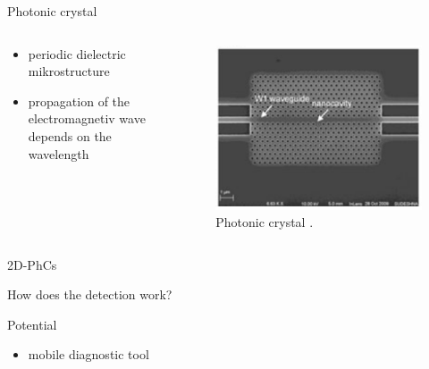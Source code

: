 \begin{frame}{Photonic crystal}
  \begin{columns}

    \begin{column}{0.49\textwidth}
    \begin{itemize}
      \item{periodic dielectric mikrostructure}
      \item{propagation of the electromagnetiv wave depends on the wavelength}
    \end{itemize}
    \end{column}


    \begin{column}{0.49\textwidth}
    \begin{figure}
      \centering
      \includegraphics[width=1\textwidth]{./bilder/photonic_crystial.png}
      \caption{Photonic crystal \cite{nano}.}
      \label{fig: photonic_crystal}
    \end{figure}
  \end{column}

  \end{columns}

\end{frame}

\begin{frame}{2D-PhCs}

\end{frame}

\begin{frame}{How does the detection work?}

\end{frame}

\begin{frame}{Potential}
  \begin{itemize}
    \item { mobile diagnostic tool}
  \end{itemize}
\end{frame}

\begin{frame}
  \nocite{*}
  \printbibliography
\end{frame}

